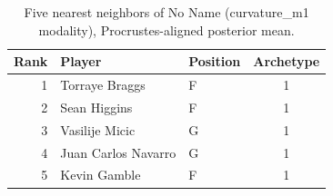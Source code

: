 \begin{table}[htbp]
  \centering\small
  \begin{tabular}{rllc}
    \toprule
    Rank & Player & Position & Archetype \\
    \midrule
    1 & Torraye Braggs & F & 1 \\
    2 & Sean Higgins & F & 1 \\
    3 & Vasilije Micic & G & 1 \\
    4 & Juan Carlos Navarro & G & 1 \\
    5 & Kevin Gamble & F & 1 \\
    \bottomrule
  \end{tabular}
  \caption{Five nearest neighbors of No Name (curvature_m1 modality), Procrustes-aligned posterior mean.}
  \label{tab:No_Name_neighbors_curvature_m1}
\end{table}

